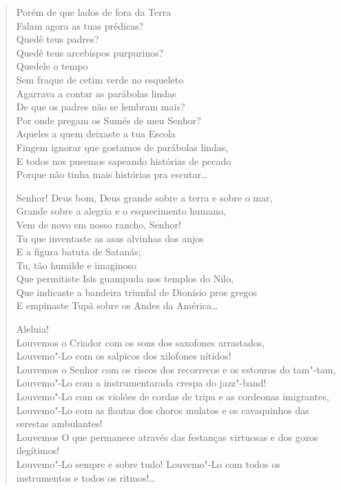 \begin{verse}
Porém de que lados de fora da Terra\\
Falam agora as tuas prédicas?\\
Quedê teus padres?\\
Quedê teus arcebispos purpurinos?\\
Quedele o tempo\\
Sem fraque de cetim verde no esqueleto\\
Agarrava a contar as parábolas lindas\\
De que os padres não se lembram mais?\\
Por onde pregam os Sumés de meu Senhor?\\
Aqueles a quem deixaste a tua Escola\\
Fingem ignorar que gostamos de parábolas lindas,\\
E todos nos pusemos sapeando histórias de pecado\\
Porque não tinha mais histórias pra escutar\ldots{}

Senhor! Deus bom, Deus grande sobre a terra e sobre o mar,\\
Grande sobre a alegria e o esquecimento humano,\\
Vem de novo em nosso rancho, Senhor!\\
Tu que inventaste as asas alvinhas dos anjos\\
E a figura batuta de Satanás;\\
Tu, tão humilde e imaginoso\\
Que permitiste Isis guampuda nos templos do Nilo,\\
Que indicaste a bandeira triunfal de Dionísio pros gregos\\
E empinaste Tupã sobre os Andes da América\ldots{}

Aleluia!\\
Louvemos o Criador com os sons dos saxofones arrastados,\\
Louvemo"-Lo com os salpicos dos xilofones nítidos!\\
Louvemos o Senhor com os riscos dos recorrecos e os estouros do tam"-tam,\\
Louvemo"-Lo com a instrumentarada crespa do jazz"-band!\\
Louvemo"-Lo com os violões de cordas de tripa e as cordeonas imigrantes,\\
Louvemo"-Lo com as flautas dos choros mulatos e os cavaquinhos das serestas ambulantes!\\
Louvemos O que permanece através das festanças virtuosas e dos gozos ilegítimos!\\
Louvemo"-Lo sempre e sobre tudo! Louvemo"-Lo com todos os instrumentos e todos os
ritmos!\ldots{}


\end{verse}
